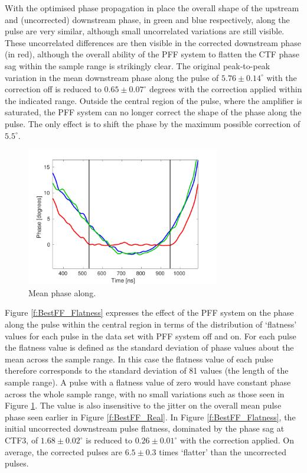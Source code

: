 With the optimised phase propagation in place the overall shape of the upstream and (uncorrected) downstream phase, in green and blue respectively, along the pulse are very similar, although small uncorrelated variations are still visible. These uncorrelated differences are then visible in the corrected downstream phase (in red), although the overall ability of the PFF system to flatten the CTF phase sag within the sample range is strikingly clear. The original peak-to-peak variation in the mean downstream phase along the pulse of \(5.76\pm0.14^\circ\) with the correction off is reduced to \(0.65\pm0.07^\circ\) degrees with the correction applied within the indicated range. Outside the central region of the pulse, where the amplifier is saturated, the PFF system can no longer correct the shape of the phase along the pulse. The only effect is to shift the phase by the maximum possible correction of \(5.5^\circ\).

\begin{figure}
  \centering
  \includegraphics[width=0.75\textwidth]{Figures/feedforward/BestFF_MeanPhaseAlong}
  \caption{Mean phase along.}
  \label{f:BestFF_MeanPhaseAlong}
\end{figure}

Figure \ref{f:BestFF_Flatness} expresses the effect of the PFF system on the phase along the pulse within the central region in terms of the distribution of `flatness' values for each pulse in the data set with PFF system off and on. For each pulse the flatness value is defined as the standard deviation of phase values about the mean across the sample range. In this case the flatness value of each pulse therefore corresponds to the standard deviation of 81 values (the length of the sample range). A pulse with a flatness value of zero would have constant phase across the whole sample range, with no small variations such as those seen in Figure \ref{f:BestFF_MeanPhaseAlong}. The value is also insensitive to the jitter on the overall mean pulse phase seen earlier in Figure \ref{f:BestFF_Real}. In Figure \ref{f:BestFF_Flatness}, the initial uncorrected downstream pulse flatness, dominated by the phase sag at CTF3, of \(1.68\pm0.02^\circ\) is reduced to \(0.26\pm0.01^\circ\) with the correction applied. On average, the corrected pulses are \(6.5\pm0.3\) times `flatter' than the uncorrected pulses.

